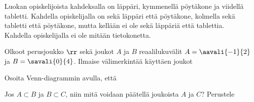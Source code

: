\begin{kotitehtavasivu}
\begin{tehtava}
Luokan opiskelijoista kahdeksalla on läppäri, kymmenellä pöytäkone ja
viidellä tabletti.
Kahdella opiskelijalla on sekä läppäri että pöytäkone, kolmella sekä
tabletti että pöytäkone, mutta kellään ei ole sekä läppäriä että
tablettia. Kahdella opiskelijalla ei ole mitään tietokonetta.

    \begin{vastaus}
    
    \end{vastaus}
\end{tehtava}

\begin{tehtava}
Olkoot perusjoukko $\rr$ sekä joukot $A$ ja $B$ reaalilukuvälit $A=\aavali{-1}{2}$ ja $B=\savali{0}{4}$. Ilmaise välimerkintää käyttäen joukot

    \begin{vastaus}
    
    \end{vastaus}
\end{tehtava}


\begin{tehtava}
Osoita Venn-diagrammin avulla, että

\end{tehtava}


\begin{tehtava}
Jos $A\subset B$ ja $B\subset C$, niin mitä voidaan päätellä joukoista $A$ ja $C$? Perustele 


\end{tehtava}
\end{kotitehtavasivu}
